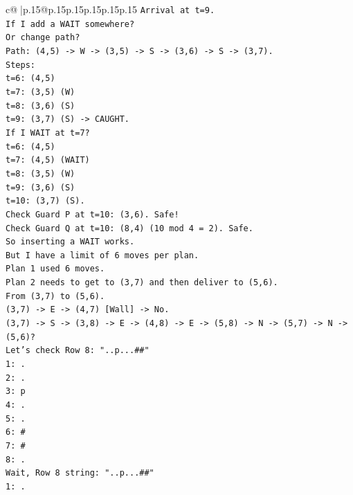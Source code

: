 \documentclass{article}
\begin{document}
{\begin{supertabular}{c@{$\;$}|p{.15\linewidth}@{}p{.15\linewidth}p{.15\linewidth}p{.15\linewidth}p{.15\linewidth}p{.15\linewidth}}
{{{\texttt{Arrival at t=9.} \\
\texttt{If I add a WAIT somewhere?} \\
\texttt{Or change path?} \\
\texttt{Path: (4,5) {-}> W {-}> (3,5) {-}> S {-}> (3,6) {-}> S {-}> (3,7).} \\
\texttt{Steps:} \\
\texttt{t=6: (4,5)} \\
\texttt{t=7: (3,5) (W)} \\
\texttt{t=8: (3,6) (S)} \\
\texttt{t=9: (3,7) (S) {-}> CAUGHT.} \\
\texttt{If I WAIT at t=7?} \\
\texttt{t=6: (4,5)} \\
\texttt{t=7: (4,5) (WAIT)} \\
\texttt{t=8: (3,5) (W)} \\
\texttt{t=9: (3,6) (S)} \\
\texttt{t=10: (3,7) (S).} \\
\texttt{Check Guard P at t=10: (3,6). Safe!} \\
\texttt{Check Guard Q at t=10: (8,4) (10 mod 4 = 2). Safe.} \\
\texttt{So inserting a WAIT works.} \\
\texttt{But I have a limit of 6 moves per plan.} \\
\texttt{Plan 1 used 6 moves.} \\
\texttt{Plan 2 needs to get to (3,7) and then deliver to (5,6).} \\
\texttt{From (3,7) to (5,6).} \\
\texttt{(3,7) {-}> E {-}> (4,7) {[}Wall{]} {-}> No.} \\
\texttt{(3,7) {-}> S {-}> (3,8) {-}> E {-}> (4,8) {-}> E {-}> (5,8) {-}> N {-}> (5,7) {-}> N {-}> (5,6)?} \\
\texttt{Let's check Row 8: "..p...\#\#"} \\
\texttt{1: .} \\
\texttt{2: .} \\
\texttt{3: p} \\
\texttt{4: .} \\
\texttt{5: .} \\
\texttt{6: \#} \\
\texttt{7: \#} \\
\texttt{8: .} \\
\texttt{Wait, Row 8 string: "..p...\#\#"} \\
\texttt{1: .} \\
}}}
\end{supertabular}}
\end{document}
